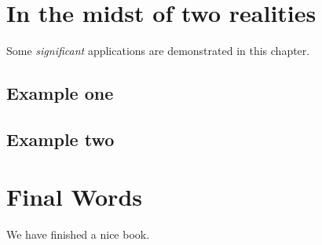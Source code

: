\documentclass[
]{book}
\begin{document}
\hypertarget{chapter8}{%
\chapter{In the midst of two realities}\label{chapter8}}

Some \emph{significant} applications are demonstrated in this chapter.

\hypertarget{example-one-2}{%
\section{Example one}\label{example-one-2}}

\hypertarget{example-two-2}{%
\section{Example two}\label{example-two-2}}

\hypertarget{chapter10}{%
\chapter{Final Words}\label{chapter10}}

We have finished a nice book.

\printbibliography
\end{document}
